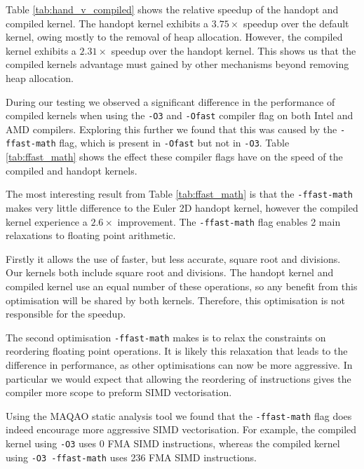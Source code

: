 Table \ref{tab:hand_v_compiled} shows the relative speedup of the handopt and compiled kernel.
The handopt kernel exhibits a $3.75\times$ speedup over the default kernel, owing mostly to the removal of heap allocation.
However, the compiled kernel exhibits a $2.31\times$ speedup over the handopt kernel.
This shows us that the compiled kernels advantage must gained by other mechanisms beyond removing heap allocation.

During our testing we observed a significant difference in the performance of compiled kernels when using the \texttt{-O3} and \texttt{-Ofast} compiler flag on both Intel and AMD compilers.
Exploring this further we found that this was caused by the \texttt{-ffast-math} flag, which is present in \texttt{-Ofast} but not in \texttt{-O3}.
Table \ref{tab:ffast_math} shows the effect these compiler flags have on the speed of the compiled and handopt kernels.

\begin{table}
    \centering
 
\caption{}\label{tab:ffast_math} 
\end{table}

The most interesting result from Table \ref{tab:ffast_math} is that the \texttt{-ffast-math} makes very little difference to the Euler 2D handopt kernel, however the compiled kernel experience a $2.6\times$ improvement.
The \texttt{-ffast-math} flag enables 2 main relaxations to floating point arithmetic.

Firstly it allows the use of faster, but less accurate, square root and divisions.
Our kernels both include square root and divisions.
The handopt kernel and compiled kernel use an equal number of these operations, so any benefit from this optimisation will be shared by both kernels.
Therefore, this optimisation is not responsible for the speedup.


The second optimisation \texttt{-ffast-math} makes is to relax the constraints on reordering floating point operations.
It is likely this relaxation that leads to the difference in performance, as other optimisations can now be more aggressive.
In particular we would expect that allowing the reordering of instructions gives the compiler more scope to preform SIMD vectorisation.

Using the MAQAO static analysis tool we found that the \texttt{-ffast-math} flag does indeed encourage more aggressive SIMD vectorisation.
For example, the compiled kernel using \texttt{-O3} uses 0 FMA SIMD instructions, whereas the compiled kernel using \texttt{-O3 -ffast-math} uses 236 FMA SIMD instructions.


